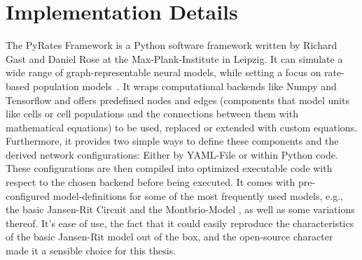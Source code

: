 
\section{Implementation Details}\label{sec:pyrates-framework}
The PyRates Framework is a Python software framework written by Richard Gast and Daniel Rose at
the Max-Plank-Institute in Leipzig.
It can simulate a wide range of graph-representable neural models,
while setting a focus on rate-based population models~\parencite{gast_pyratespython_2019}.
It wraps computational backends like Numpy and Tensorflow and offers predefined nodes and
edges (components that model units like cells or cell populations and the
connections between them with mathematical equations) to be used,
replaced or extended with custom equations.
Furthermore, it provides two simple ways to define these components and the derived network configurations:
Either by YAML-File or within Python code.
These configurations are then compiled into optimized executable code with respect to
the chosen backend before being executed.
It comes with pre-configured model-definitions for some of the most frequently used models, e.g., the basic
Jansen-Rit Circuit \parencite{jansen_electroencephalogram_1995} and the
Montbrio-Model \parencite{montbrio_macroscopic_2015}, as well as some variations thereof.
It's ease of use, the fact that it could easily reproduce the characteristics of
the basic Jansen-Rit model out of the box, and the open-source character made it a sensible choice for this thesis.
%
%
%
%
%
%
%
%

